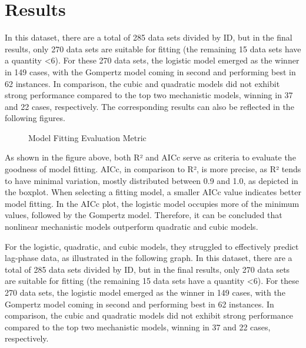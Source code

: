 \documentclass[11pt]{article}
\begin{document}
\section{Results}
In this dataset, there are a total of 285 data sets divided by ID, but in the final results, only 270 data sets are suitable for fitting (the remaining 15 data sets have a quantity <6). For these 270 data sets, the logistic model emerged as the winner in 149 cases, with the Gompertz model coming in second and performing best in 62 instances. In comparison, the cubic and quadratic models did not exhibit strong performance compared to the top two mechanistic models, winning in 37 and 22 cases, respectively. The corresponding results can also be reflected in the following figures.\par
\begin{figure}[H]
 \hfill
\caption{Model Fitting Evaluation Metric}
\end{figure}\par
As shown in the figure above, both R² and AICc serve as criteria to evaluate the goodness of model fitting. AICc, in comparison to R², is more precise, as R² tends to have minimal variation, mostly distributed between 0.9 and 1.0, as depicted in the boxplot. When selecting a fitting model, a smaller AICc value indicates better model fitting. In the AICc plot, the logistic model occupies more of the minimum values, followed by the Gompertz model. Therefore, it can be concluded that nonlinear mechanistic models outperform quadratic and cubic models.\par

For the logistic, quadratic, and cubic models, they struggled to effectively predict lag-phase data, as illustrated in the following graph.
In this dataset, there are a total of 285 data sets divided by ID, but in the final results, only 270 data sets are suitable for fitting (the remaining 15 data sets have a quantity <6). For these 270 data sets, the logistic model emerged as the winner in 149 cases, with the Gompertz model coming in second and performing best in 62 instances. In comparison, the cubic and quadratic models did not exhibit strong performance compared to the top two mechanistic models, winning in 37 and 22 cases, respectively.
\end{document}
